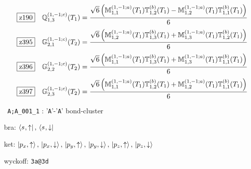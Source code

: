 \documentclass[fleqn,10pt,landscape]{jsarticle}
\begin{document}
\begin{dmath*}
\hspace*{3mm}\fbox{z190}\quad \mathbb{Q}_{1,3}^{(1,-1;c)}(T_{1})=\frac{\sqrt{6} \left(\mathbb{M}_{1,1}^{(1,-1;a)}(T_{1}) \mathbb{T}_{1,2}^{(b)}(T_{1}) - \mathbb{M}_{1,2}^{(1,-1;a)}(T_{1}) \mathbb{T}_{1,1}^{(b)}(T_{1})\right)}{6}
\end{dmath*}
\begin{dmath*}
\hspace*{3mm}\fbox{z395}\quad \mathbb{G}_{2,1}^{(1,-1;c)}(T_{2})=\frac{\sqrt{6} \left(\mathbb{M}_{1,2}^{(1,-1;a)}(T_{1}) \mathbb{T}_{1,3}^{(b)}(T_{1}) + \mathbb{M}_{1,3}^{(1,-1;a)}(T_{1}) \mathbb{T}_{1,2}^{(b)}(T_{1})\right)}{6}
\end{dmath*}
\begin{dmath*}
\hspace*{3mm}\fbox{z396}\quad \mathbb{G}_{2,2}^{(1,-1;c)}(T_{2})=\frac{\sqrt{6} \left(\mathbb{M}_{1,1}^{(1,-1;a)}(T_{1}) \mathbb{T}_{1,3}^{(b)}(T_{1}) + \mathbb{M}_{1,3}^{(1,-1;a)}(T_{1}) \mathbb{T}_{1,1}^{(b)}(T_{1})\right)}{6}
\end{dmath*}
\begin{dmath*}
\hspace*{3mm}\fbox{z397}\quad \mathbb{G}_{2,3}^{(1,-1;c)}(T_{2})=\frac{\sqrt{6} \left(\mathbb{M}_{1,1}^{(1,-1;a)}(T_{1}) \mathbb{T}_{1,2}^{(b)}(T_{1}) + \mathbb{M}_{1,2}^{(1,-1;a)}(T_{1}) \mathbb{T}_{1,1}^{(b)}(T_{1})\right)}{6}
\end{dmath*}
\vspace{5mm}

\noindent\textbullet\, \texttt{A;A_001_1} : '\texttt{A}'-'\texttt{A}' bond-cluster

\noindent\quad * bra: $\bra{s_{},\uparrow},\, \bra{s_{},\downarrow}$

\noindent\quad * ket: $\ket{p_{x},\uparrow},\, \ket{p_{x},\downarrow},\, \ket{p_{y},\uparrow},\, \ket{p_{y},\downarrow},\, \ket{p_{z},\uparrow},\, \ket{p_{z},\downarrow}$

\noindent\quad * wyckoff: \texttt{3a@3d}
\end{document}

